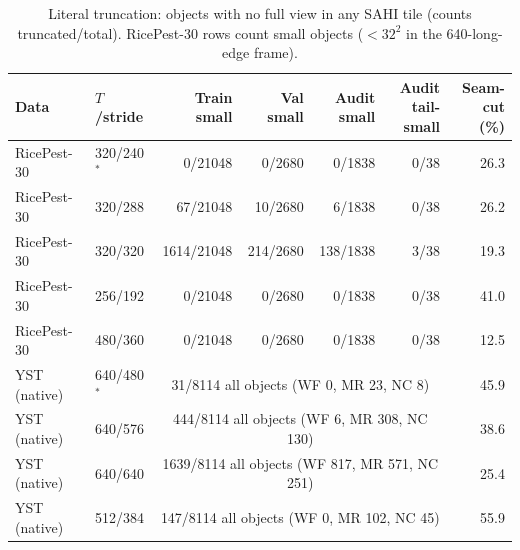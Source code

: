 \begin{table}[!htbp]
\scriptsize
\setlength{\tabcolsep}{4pt}
\caption{Literal truncation: objects with no full view in any SAHI tile (counts truncated/total). RicePest-30 rows count small objects ($<32^2$ in the 640-long-edge frame).}
\label{tab:truncation}
\begin{tabular*}{\textwidth}{@{\extracolsep{\fill}}llrrrrr}
\toprule
Data & $T$/stride & \shortstack{Train\\small} & \shortstack{Val\\small} & \shortstack{Audit\\small} & \shortstack{Audit\\tail-small} & \shortstack{Seam-cut\\(\%)} \\
\midrule
RicePest-30 & 320/240$^{\ast}$ & 0/21048 & 0/2680 & 0/1838 & 0/38 & 26.3 \\
RicePest-30 & 320/288 & 67/21048 & 10/2680 & 6/1838 & 0/38 & 26.2 \\
RicePest-30 & 320/320 & 1614/21048 & 214/2680 & 138/1838 & 3/38 & 19.3 \\
RicePest-30 & 256/192 & 0/21048 & 0/2680 & 0/1838 & 0/38 & 41.0 \\
RicePest-30 & 480/360 & 0/21048 & 0/2680 & 0/1838 & 0/38 & 12.5 \\
YST (native) & 640/480$^{\ast}$ & \multicolumn{4}{c}{31/8114 all objects (WF 0, MR 23, NC 8)} & 45.9 \\
YST (native) & 640/576 & \multicolumn{4}{c}{444/8114 all objects (WF 6, MR 308, NC 130)} & 38.6 \\
YST (native) & 640/640 & \multicolumn{4}{c}{1639/8114 all objects (WF 817, MR 571, NC 251)} & 25.4 \\
YST (native) & 512/384 & \multicolumn{4}{c}{147/8114 all objects (WF 0, MR 102, NC 45)} & 55.9 \\
\bottomrule
\end{tabular*}
\end{table}
